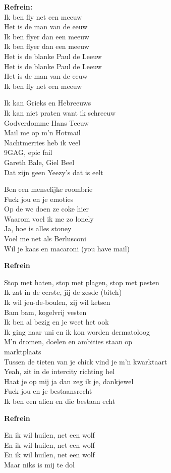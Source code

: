 \textbf{Refrein:}\\
Ik ben fly net een meeuw\\
Het is de man van de eeuw\\
Ik ben flyer dan een meeuw\\
Ik ben flyer dan een meeuw\\
Het is de blanke Paul de Leeuw\\
Het is de blanke Paul de Leeuw\\
Het is de man van de eeuw\\
Ik ben fly net een meeuw

Ik kan Grieks en Hebreeuws\\
Ik kan niet praten want ik schreeuw\\
Godverdomme Hans Teeuw\\
Mail me op m'n Hotmail\\
Nachtmerries heb ik veel\\
9GAG, epic fail\\
Gareth Bale, Giel Beel\\
Dat zijn geen Yeezy's dat is eelt

Ben een menselijke roombrie\\
Fuck jou en je emoties\\
Op de wc doen ze coke hier\\
Waarom voel ik me zo lonely\\
Ja, hoe is alles stoney\\
Voel me net als Berlusconi\\
Wil je kaas en macaroni (you have mail)

\textbf{Refrein}

Stop met haten, stop met plagen, stop met pesten\\
Ik zat in de eerste, jij de zesde (bitch)\\
Ik wil jeu-de-boulen, zij wil ketsen\\
Bam bam, kogelvrij vesten\\
Ik ben al bezig en je weet het ook\\
Ik ging naar uni en ik kon worden dermatoloog\\
M'n dromen, doelen en ambities staan op\\ marktplaats\\
Tussen de tieten van je chick vind je m'n kwarktaart\\
Yeah, zit in de intercity richting hel\\
Haat je op mij ja dan zeg ik je, dankjewel\\
Fuck jou en je bestaansrecht\\
Ik ben een alien en die bestaan echt

\textbf{Refrein}

En ik wil huilen, net een wolf\\
En ik wil huilen, net een wolf\\
En ik wil huilen, net een wolf\\
Maar niks is mij te dol
